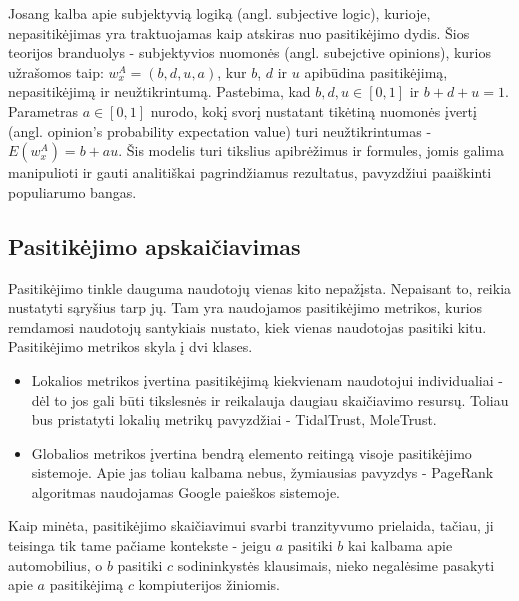 \documentclass{VUMIFInfMagistrinis}
\begin{document}
\newline
\indent
Josang \cite{18} kalba apie subjektyvią logiką (angl. subjective logic), kurioje, nepasitikėjimas yra traktuojamas kaip atskiras nuo pasitikėjimo dydis. Šios teorijos branduolys - subjektyvios nuomonės (angl. subejctive opinions), kurios užrašomos taip: $w_{x}^{A} = (b,d,u,a)$, kur $b$, $d$ ir $u$ apibūdina pasitikėjimą, nepasitikėjimą ir neužtikrintumą. Pastebima, kad $b,d,u \in [0,1]$ ir $b+d+u=1$. Parametras $a \in [0,1]$ nurodo, kokį svorį nustatant tikėtiną nuomonės įvertį (angl. opinion's probability expectation value) turi neužtikrintumas - $E(w_x^A)=b+au$. Šis modelis turi tikslius apibrėžimus ir formules, jomis galima manipulioti ir gauti analitiškai pagrindžiamus rezultatus, pavyzdžiui paaiškinti populiarumo bangas. 
\subsection{Pasitikėjimo apskaičiavimas}\label{ssec:trust}
Pasitikėjimo tinkle dauguma naudotojų vienas kito nepažįsta. Nepaisant to, reikia nustatyti sąryšius tarp jų. Tam yra naudojamos pasitikėjimo metrikos, kurios remdamosi naudotojų santykiais nustato, kiek vienas naudotojas pasitiki kitu. Pasitikėjimo metrikos skyla į dvi klases.
\begin{itemize}
	\item Lokalios metrikos įvertina pasitikėjimą kiekvienam naudotojui individualiai - dėl to jos gali būti tikslesnės ir reikalauja daugiau skaičiavimo resursų. Toliau bus pristatyti lokalių metrikų pavyzdžiai - TidalTrust, MoleTrust.
	\item Globalios metrikos įvertina bendrą elemento reitingą visoje pasitikėjimo sistemoje. Apie jas toliau kalbama nebus, žymiausias pavyzdys - PageRank algoritmas naudojamas Google paieškos sistemoje.
\end{itemize}
Kaip minėta, pasitikėjimo skaičiavimui svarbi tranzityvumo prielaida, tačiau, ji teisinga tik tame pačiame kontekste - jeigu $a$ pasitiki $b$ kai kalbama apie automobilius, o $b$ pasitiki $c$ sodininkystės klausimais, nieko negalėsime pasakyti apie $a$ pasitikėjimą $c$ kompiuterijos žiniomis.
\end{document}
